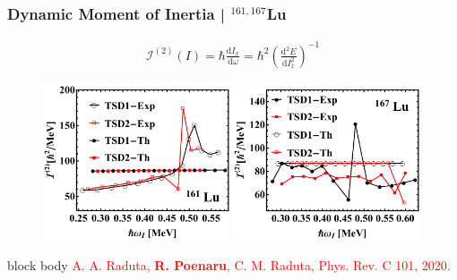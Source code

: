 \documentclass{beamer}
\begin{document}
\begin{frame}
	\frametitle{Dynamic Moment of Inertia | $^{161,167}$Lu}
	\vspace{-0.5cm}
	\begin{align}
		\mathcal{I}^{(2)}(I)=\hbar\frac{\text{d}I_x}{\text{d}\omega}=\hbar^2\left(\frac{\text{d}^2E}{\text{d}I_x^2}\right)^{-1}\nonumber
	\end{align}
	\vspace{-0.5cm}
	\begin{figure}
		\centering
		\includegraphics[width=0.49\textwidth]{figures/Lu-exp-energies/fig15_lu161.pdf}
		\includegraphics[width=0.49\textwidth]{figures/Lu-exp-energies/fig18_lu167.pdf}
	\end{figure}
	\begin{beamercolorbox}[rounded=true,shadow=false, wd=\linewidth,]{block body}
		\centering
		\textcolor{red}{\footnotesize{A. A. Raduta, \textbf{R. Poenaru}, C. M. Raduta, Phys. Rev. C 101, 2020.}}
	\end{beamercolorbox}
\end{frame}
\end{document}
